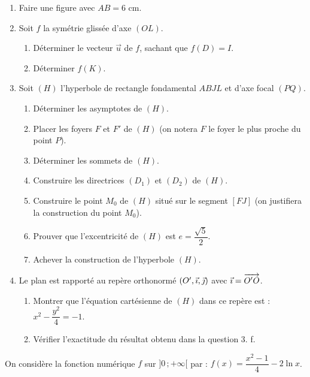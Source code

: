 \documentclass[11pt]{article}
\begin{document}
\begin{enumerate}
  \item Faire une figure avec $AB = 6$ cm.
  \item Soit $f$ la symétrie glissée d'axe $(OL)$.
  \begin{enumerate}[label=\alph*.]
    \item Déterminer le vecteur $\vec{u}$ de $f$, sachant que $f(D) = I$.
    \item Déterminer $f(K)$.
  \end{enumerate}
  \item Soit $(H)$ l'hyperbole de rectangle fondamental $ABJL$ et d'axe focal $(PQ)$.
  \begin{enumerate}[label=\alph*.]
    \item Déterminer les asymptotes de $(H)$.
    \item Placer les foyers $F$ et $F'$ de $(H)$ (on notera $F$ le foyer le plus proche du point $P$).
    \item Déterminer les sommets de $(H)$.
    \item Construire les directrices $(D_1)$ et $(D_2)$ de $(H)$.
    \item Construire le point $M_0$ de $(H)$ situé sur le segment $[FJ]$ (on justifiera la construction du point $M_0$).
    \item Prouver que l'excentricité de $(H)$ est $e = \dfrac{\sqrt{5}}{2}$.
    \item Achever la construction de l'hyperbole $(H)$.
  \end{enumerate}
  \item Le plan est rapporté au repère orthonormé $(O',\vec{\imath},\vec{\jmath})$ avec $\vec{\imath} = \overrightarrow{O'O}$.
  \begin{enumerate}[label=\alph*.]
    \item Montrer que l'équation cartésienne de $(H)$ dans ce repère est : $x^2 - \dfrac{y^2}{4} = -1$.
    \item Vérifier l'exactitude du résultat obtenu dans la question 3. f.
  \end{enumerate}
\end{enumerate}


On considère la fonction numérique $f$ sur $]0\,;+\infty[$ par : $f(x) = \dfrac{x^2 - 1}{4} - 2\ln x$.
\end{document}

